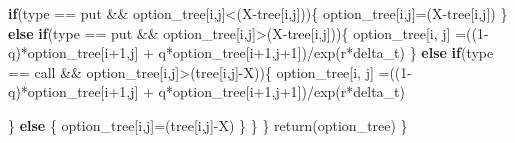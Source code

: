 \documentclass[
]{article}
\newenvironment{Shaded}{\begin{snugshade}}{\end{snugshade}}
\newcommand{\ControlFlowTok}[1]{\textcolor[rgb]{0.13,0.29,0.53}{\textbf{#1}}}
\newcommand{\DecValTok}[1]{\textcolor[rgb]{0.00,0.00,0.81}{#1}}
\newcommand{\FunctionTok}[1]{\textcolor[rgb]{0.00,0.00,0.00}{#1}}
\newcommand{\NormalTok}[1]{#1}
\newcommand{\OtherTok}[1]{\textcolor[rgb]{0.56,0.35,0.01}{#1}}
\newcommand{\SpecialCharTok}[1]{\textcolor[rgb]{0.00,0.00,0.00}{#1}}
\newcommand{\StringTok}[1]{\textcolor[rgb]{0.31,0.60,0.02}{#1}}
\begin{document}
\begin{Shaded}
\begin{Highlighting}[]
      \ControlFlowTok{if}\NormalTok{(type }\SpecialCharTok{==} \StringTok{\textquotesingle{}put\textquotesingle{}} \SpecialCharTok{\&\&}\NormalTok{ option\_tree[i,j]}\SpecialCharTok{\textless{}}\NormalTok{(X}\SpecialCharTok{{-}}\NormalTok{tree[i,j]))\{}
\NormalTok{        option\_tree[i,j]}\OtherTok{=}\NormalTok{(X}\SpecialCharTok{{-}}\NormalTok{tree[i,j])}
\NormalTok{      \} }
      \ControlFlowTok{else} \ControlFlowTok{if}\NormalTok{(type }\SpecialCharTok{==} \StringTok{\textquotesingle{}put\textquotesingle{}} \SpecialCharTok{\&\&}\NormalTok{ option\_tree[i,j]}\SpecialCharTok{\textgreater{}}\NormalTok{(X}\SpecialCharTok{{-}}\NormalTok{tree[i,j]))\{}
\NormalTok{        option\_tree[i, j] }\OtherTok{=}\NormalTok{((}\DecValTok{1}\SpecialCharTok{{-}}\NormalTok{q)}\SpecialCharTok{*}\NormalTok{option\_tree[i}\SpecialCharTok{+}\DecValTok{1}\NormalTok{,j] }\SpecialCharTok{+}\NormalTok{ q}\SpecialCharTok{*}\NormalTok{option\_tree[i}\SpecialCharTok{+}\DecValTok{1}\NormalTok{,j}\SpecialCharTok{+}\DecValTok{1}\NormalTok{])}\SpecialCharTok{/}\FunctionTok{exp}\NormalTok{(r}\SpecialCharTok{*}\NormalTok{delta\_t)}
\NormalTok{      \} }
      \ControlFlowTok{else} \ControlFlowTok{if}\NormalTok{(type }\SpecialCharTok{==} \StringTok{\textquotesingle{}call\textquotesingle{}} \SpecialCharTok{\&\&}\NormalTok{ option\_tree[i,j]}\SpecialCharTok{\textgreater{}}\NormalTok{(tree[i,j]}\SpecialCharTok{{-}}\NormalTok{X))\{}
\NormalTok{        option\_tree[i, j] }\OtherTok{=}\NormalTok{((}\DecValTok{1}\SpecialCharTok{{-}}\NormalTok{q)}\SpecialCharTok{*}\NormalTok{option\_tree[i}\SpecialCharTok{+}\DecValTok{1}\NormalTok{,j] }\SpecialCharTok{+}\NormalTok{ q}\SpecialCharTok{*}\NormalTok{option\_tree[i}\SpecialCharTok{+}\DecValTok{1}\NormalTok{,j}\SpecialCharTok{+}\DecValTok{1}\NormalTok{])}\SpecialCharTok{/}\FunctionTok{exp}\NormalTok{(r}\SpecialCharTok{*}\NormalTok{delta\_t)}
        
\NormalTok{      \} }
      \ControlFlowTok{else}\NormalTok{ \{}
\NormalTok{        option\_tree[i,j]}\OtherTok{=}\NormalTok{(tree[i,j]}\SpecialCharTok{{-}}\NormalTok{X)}
\NormalTok{      \}}
\NormalTok{    \}}
\NormalTok{  \}}
  \FunctionTok{return}\NormalTok{(option\_tree)}
\NormalTok{\}}


\end{Highlighting}
\end{Shaded}
\end{document}
